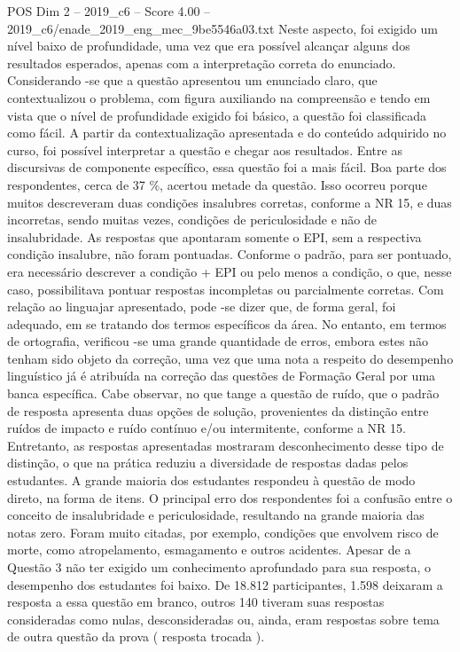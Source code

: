 \begin{textsample}{POS Dim 2 – 2019\_c6 – Score 4.00 – 2019\_c6/enade\_2019\_eng\_mec\_9be5546a03.txt}
Neste aspecto, foi exigido um nível baixo de profundidade, uma vez que era possível alcançar alguns dos resultados esperados, apenas com a interpretação correta do enunciado.
Considerando -se que a questão apresentou um enunciado claro, que contextualizou o problema, com figura auxiliando na compreensão e tendo em vista que o nível de profundidade exigido foi básico, a questão foi classificada como fácil.
A partir da contextualização apresentada e do conteúdo adquirido no curso, foi possível interpretar a questão e chegar aos resultados.
Entre as discursivas de componente específico, essa questão foi a mais fácil.
Boa parte dos respondentes, cerca de 37 \%, acertou metade da questão.
Isso ocorreu porque muitos descreveram duas condições insalubres corretas, conforme a NR 15, e duas incorretas, sendo muitas vezes, condições de periculosidade e não de insalubridade.
As respostas que apontaram somente o EPI, sem a respectiva condição insalubre, não foram pontuadas.
Conforme o padrão, para ser pontuado, era necessário descrever a condição + EPI ou pelo menos a condição, o que, nesse caso, possibilitava pontuar respostas incompletas ou parcialmente corretas.
Com relação ao linguajar apresentado, pode -se dizer que, de forma geral, foi adequado, em se tratando dos termos específicos da área.
No entanto, em termos de ortografia, verificou -se uma grande quantidade de erros, embora estes não tenham sido objeto da correção, uma vez que uma nota a respeito do desempenho linguístico já é atribuída na correção das questões de Formação Geral por uma banca específica.
Cabe observar, no que tange a questão de ruído, que o padrão de resposta apresenta duas opções de solução, provenientes da distinção entre ruídos de impacto e ruído contínuo e/ou intermitente, conforme a NR 15.
Entretanto, as respostas apresentadas mostraram desconhecimento desse tipo de distinção, o que na prática reduziu a diversidade de respostas dadas pelos estudantes.
A grande maioria dos estudantes respondeu à questão de modo direto, na forma de itens.
O principal erro dos respondentes foi a confusão entre o conceito de insalubridade e periculosidade, resultando na grande maioria das notas zero.
Foram muito citadas, por exemplo, condições que envolvem risco de morte, como atropelamento, esmagamento e outros acidentes.
Apesar de a Questão 3 não ter exigido um conhecimento aprofundado para sua resposta, o desempenho dos estudantes foi baixo.
De 18.812 participantes, 1.598 deixaram a resposta a essa questão em branco, outros 140 tiveram suas respostas consideradas como nulas, desconsideradas ou, ainda, eram respostas sobre tema de outra questão da prova ( resposta trocada ).

\end{textsample}
